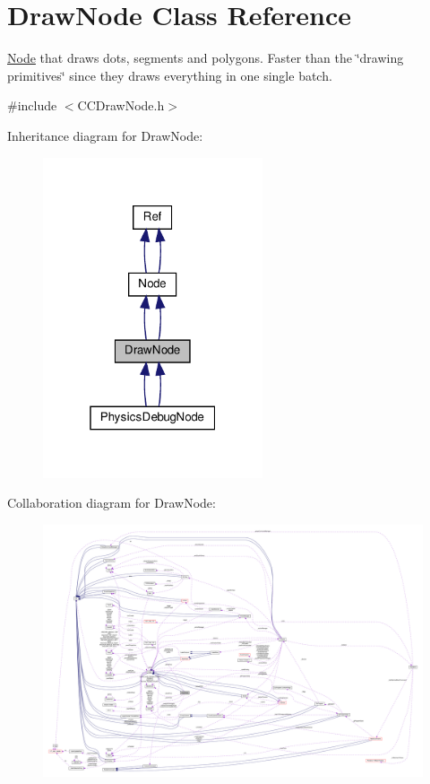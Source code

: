 \hypertarget{classDrawNode}{}\section{Draw\+Node Class Reference}
\label{classDrawNode}


\hyperlink{classNode}{Node} that draws dots, segments and polygons. Faster than the \char`\"{}drawing primitives\char`\"{} since they draws everything in one single batch.  




{\ttfamily \#include $<$C\+C\+Draw\+Node.\+h$>$}



Inheritance diagram for Draw\+Node\+:
\nopagebreak
\begin{figure}[H]
\begin{center}
\leavevmode
\includegraphics[width=184pt]{classDrawNode__inherit__graph}
\end{center}
\end{figure}


Collaboration diagram for Draw\+Node\+:
\nopagebreak
\begin{figure}[H]
\begin{center}
\leavevmode
\includegraphics[width=350pt]{classDrawNode__coll__graph}
\end{center}
\end{figure}
